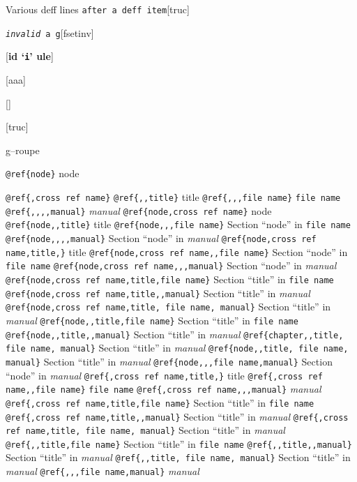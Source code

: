 \documentclass{book}
\begin{document}
\begin{titlepage}
%
Various deff lines
\noindent\texttt\bgroup{}after a deff item\egroup{}\hfill[truc]



%

\noindent\texttt\bgroup{}\emph{invalid} a g\egroup{}\hfill[fsetinv]



%
\noindent\texttt\bgroup{}\egroup{}\hfill[\textbf{id `\texttt{i}' ule}]




\noindent\texttt\bgroup{}\egroup{}\hfill[aaa]



\noindent\texttt\bgroup{}\egroup{}\hfill[]



\noindent\texttt\bgroup{}\egroup{}\hfill[truc]




g--roupe

\texttt{@ref\{node\}} node

\texttt{@ref\{,cross ref name\}} 
\texttt{@ref\{,,title\}} title
\texttt{@ref\{,,,file name\}} \texttt{file name}
\texttt{@ref\{,,,,manual\}} \textit{manual}
\texttt{@ref\{node,cross ref name\}} node
\texttt{@ref\{node,,title\}} title
\texttt{@ref\{node,,,file name\}} Section ``node'' in \texttt{file name}
\texttt{@ref\{node,,,,manual\}} Section ``node'' in \textit{manual}
\texttt{@ref\{node,cross ref name,title,\}} title
\texttt{@ref\{node,cross ref name,,file name\}} Section ``node'' in \texttt{file name}
\texttt{@ref\{node,cross ref name,,,manual\}} Section ``node'' in \textit{manual}
\texttt{@ref\{node,cross ref name,title,file name\}} Section ``title'' in \texttt{file name}
\texttt{@ref\{node,cross ref name,title,,manual\}} Section ``title'' in \textit{manual}
\texttt{@ref\{node,cross ref name,title, file name, manual\}} Section ``title'' in \textit{manual}
\texttt{@ref\{node,,title,file name\}} Section ``title'' in \texttt{file name}
\texttt{@ref\{node,,title,,manual\}} Section ``title'' in \textit{manual}
\texttt{@ref\{chapter,,title, file name, manual\}} Section ``title'' in \textit{manual}
\texttt{@ref\{node,,title, file name, manual\}} Section ``title'' in \textit{manual}
\texttt{@ref\{node,,,file name,manual\}} Section ``node'' in \textit{manual}
\texttt{@ref\{,cross ref name,title,\}} title
\texttt{@ref\{,cross ref name,,file name\}} \texttt{file name}
\texttt{@ref\{,cross ref name,,,manual\}} \textit{manual}
\texttt{@ref\{,cross ref name,title,file name\}} Section ``title'' in \texttt{file name}
\texttt{@ref\{,cross ref name,title,,manual\}} Section ``title'' in \textit{manual}
\texttt{@ref\{,cross ref name,title, file name, manual\}} Section ``title'' in \textit{manual}
\texttt{@ref\{,,title,file name\}} Section ``title'' in \texttt{file name}
\texttt{@ref\{,,title,,manual\}} Section ``title'' in \textit{manual}
\texttt{@ref\{,,title, file name, manual\}} Section ``title'' in \textit{manual}
\texttt{@ref\{,,,file name,manual\}} \textit{manual}


\end{titlepage}
\end{document}
